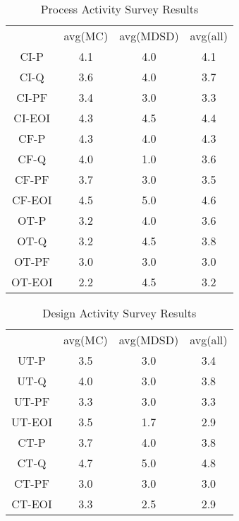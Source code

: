 \documentclass[final_report_innit.tex]{subfiles}
\newcommand\Tstrut{\rule{0pt}{2.6ex}}       %
\begin{document}
\begin{table}[h]
	\caption{Process Activity Survey Results}
	\begin{center}
		\begin{tabular}{cccc}
		
                             & avg(MC) & avg(MDSD) & avg(all) \Tstrut \\ 
		CI-P   & 4.1 & 4.0 & 4.1 \Tstrut \\ 
		CI-Q   & 3.6 & 4.0 & 3.7 \Tstrut \\ 
		CI-PF  & 3.4 & 3.0 & 3.3 \Tstrut \\ 
		CI-EOI & 4.3 & 4.5 & 4.4 \Tstrut \\ 
		CF-P   & 4.3 & 4.0 & 4.3 \Tstrut \\ 
		CF-Q   & 4.0 & 1.0 & 3.6 \Tstrut \\ 
		CF-PF  & 3.7 & 3.0 & 3.5 \Tstrut \\ 
		CF-EOI & 4.5 & 5.0 & 4.6 \Tstrut \\ 
		OT-P   & 3.2 & 4.0 & 3.6 \Tstrut \\ 
		OT-Q   & 3.2 & 4.5 & 3.8 \Tstrut \\ 
		OT-PF  & 3.0 & 3.0 & 3.0 \Tstrut \\ 
		OT-EOI & 2.2 & 4.5 & 3.2 \Tstrut \\ 
		\end{tabular}
	\end{center}
\end{table}


\begin{table}[h]
	\caption{Design Activity Survey Results}
	\begin{center}
		\begin{tabular}{cccc}
		           & avg(MC) & avg(MDSD) & avg(all) \Tstrut \\ 
			UT-P   & 3.5 & 3.0 & 3.4 \Tstrut \\  
			UT-Q   & 4.0 & 3.0 & 3.8 \Tstrut \\ 
			UT-PF  & 3.3 & 3.0 & 3.3 \Tstrut \\ 
			UT-EOI & 3.5 & 1.7 & 2.9 \Tstrut \\ 
			CT-P   & 3.7 & 4.0 & 3.8 \Tstrut \\ 
			CT-Q   & 4.7 & 5.0 & 4.8 \Tstrut \\ 
			CT-PF  & 3.0 & 3.0 & 3.0 \Tstrut \\ 
			CT-EOI & 3.3 & 2.5 & 2.9 \Tstrut \\ 
		\end{tabular}
	\end{center}
\end{table}
\end{document}
